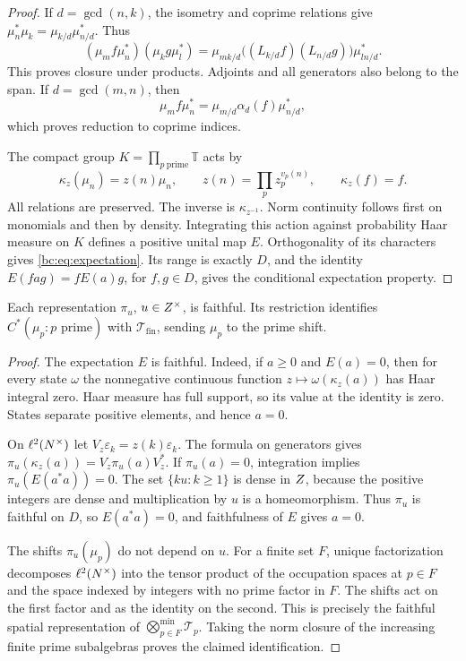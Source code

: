 \begin{proof}
If \(d=\gcd(n,k)\), the isometry and coprime relations give
\(\mu_n^*\mu_k=\mu_{k/d}\mu_{n/d}^*\). Thus
\[
 (\mu_mf\mu_n^*)(\mu_kg\mu_l^*)
 =\mu_{mk/d}\big((L_{k/d}f)(L_{n/d}g)\big)\mu_{ln/d}^*.
\]
This proves closure under products. Adjoints and all generators also
belong to the span. If \(d=\gcd(m,n)\), then
\[
 \mu_mf\mu_n^*=\mu_{m/d}\alpha_d(f)\mu_{n/d}^*,
\]
which proves reduction to coprime indices.

The compact group \(K=\prod_{p\ \mathrm{prime}}\mathbb T\) acts by
\[
 \kappa_z(\mu_n)=z(n)\mu_n,\qquad
 z(n)=\prod_pz_p^{v_p(n)},\qquad \kappa_z(f)=f.
\]
All relations are preserved. The inverse is \(\kappa_{z^{-1}}\).
Norm continuity follows first on monomials and then by density.
Integrating this action against probability Haar measure on \(K\)
defines a positive unital map \(E\). Orthogonality of its characters
gives \eqref{bc:eq:expectation}. Its range is exactly \(D\), and the
identity \(E(fag)=fE(a)g\), for \(f,g\in D\), gives the conditional
expectation property.
\end{proof}

\begin{proposition}
\label{bc:prop:faithful}
Each representation \(\pi_u\), \(u\in Z^{\times}\), is faithful.
Its restriction identifies \(C^*(\mu_p:p\text{ prime})\) with
\(\mathcal T_{\mathrm{fin}}\), sending \(\mu_p\) to the prime shift.
\end{proposition}

\begin{proof}
The expectation \(E\) is faithful. Indeed, if \(a\geq0\) and \(E(a)=0\),
then for every state \(\omega\) the nonnegative continuous function
\(z\mapsto\omega(\kappa_z(a))\) has Haar integral zero. Haar measure has
full support, so its value at the identity is zero. States separate
positive elements, and hence \(a=0\).

On \(\ell^2(N^{\times})\) let \(V_z\varepsilon_k=z(k)\varepsilon_k\).
The formula on generators gives
\(\pi_u(\kappa_z(a))=V_z\pi_u(a)V_z^*\).
If \(\pi_u(a)=0\), integration implies \(\pi_u(E(a^*a))=0\).
The set \(\{ku:k\geq1\}\) is dense in \(Z\), because the
positive integers are dense and multiplication by \(u\) is a
homeomorphism. Thus \(\pi_u\) is faithful on \(D\), so
\(E(a^*a)=0\), and faithfulness of \(E\) gives \(a=0\).

The shifts \(\pi_u(\mu_p)\) do not depend on \(u\).
For a finite set \(F\), unique factorization decomposes
\(\ell^2(N^{\times})\) into the tensor product of the occupation spaces at
\(p\in F\) and the space indexed by integers with no prime factor in
\(F\). The shifts act on the first factor and as the identity on the
second. This is precisely the faithful spatial representation of
\(\bigotimes_{p\in F}^{\min}\mathcal T_p\).
Taking the norm closure of the increasing finite prime subalgebras
proves the claimed identification.
\end{proof}

